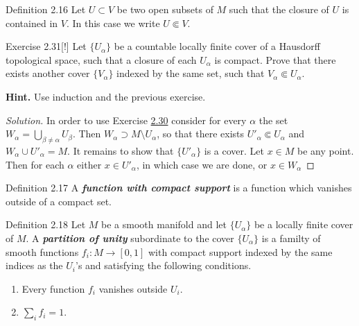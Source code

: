 \begin{thing3}{Definition 2.16}\label{def:2.16}\leavevmode
Let \(U \subset V\) be two open subsets of \(M\) such that the closure of \(U\) is contained in \(V\). In this case we write \(U \Subset V\).
\end{thing3}

\begin{thing4}{Exercise 2.31}[!]\label{exer:2.31}\leavevmode
Let \(\{U_\alpha\}\) be a countable locally finite cover of a Hausdorff topological space, such that a closure of each \(U_\alpha\) is compact. Prove that there exists another cover \(\{V_\alpha\}\) indexed by the same set, such that \(V_\alpha \Subset U_\alpha\).

\textbf{Hint.} Use induction and the previous exercise.
\end{thing4}

\begin{proof}[Solution]\leavevmode
In order to use Exercise \hyperref[exer:2.30]{2.30} consider for every \(\alpha\) the set \(W_\alpha=\bigcup_{\beta \neq  \alpha} U_\beta\). Then \(W_\alpha \supset M\setminus U_\alpha\), so that there exists \(U'_\alpha \Subset U_\alpha\) and \(W_\alpha \cup U'_\alpha=M\). It remains to show that \(\{U'_\alpha\}\) is a cover. Let \(x \in M\) be any point. Then for each \(\alpha\) either \(x \in U'_\alpha\), in which case we are done, or \(x \in W_\alpha\)
\end{proof}

\begin{thing3}{Definition 2.17}\label{def:2.17}\leavevmode
A \textit{\textbf{function with compact support}} is a function which vanishes outside of a compact set.
\end{thing3}

\begin{thing3}{Definition 2.18}\label{def:2.18}\leavevmode
	Let \(M\) be a smooth manifold and let \(\{U_\alpha\}\) be a locally finite cover of \(M\). A \textit{\textbf{partition of unity}} subordinate to the cover \(\{U_\alpha\}\) is a familty of smooth functions \(f_i:M\to [0,1]\) with compact support indexed by the same indices as the \(U_i\)'s and satisfying the following conditions.
	\begin{enumerate}[label=(\alph*)]
	\item Every function \(f_i\) vanishes outside \(U_i\).
	\item \(\sum_i f_i=1\).
	\end{enumerate}
\end{thing3}

